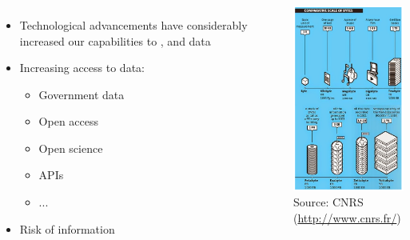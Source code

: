 \documentclass[8pt]{beamer}
\begin{document}
\begin{frame}
\frametitle{\insertsection}

\begin{columns}[c]

\begin{itemize}
	\item Technological advancements have considerably  increased our capabilities to {\color{blue}{collect}}, {\color{blue}{store}} and {\color{blue}{analyse}} data
	\item Increasing access to data:
	\begin{itemize}
		\item Government data
		\item Open access
		\item Open science
		\item APIs
		\item ...
	\end{itemize}
	\item Risk of information {\color{blue}{overload}}
\end{itemize}

\centering
\includegraphics[width=4.5cm]{byte}\\
\tiny{Source: CNRS (\url{http://www.cnrs.fr/})}

\end{columns}

\end{frame}

\end{document}
